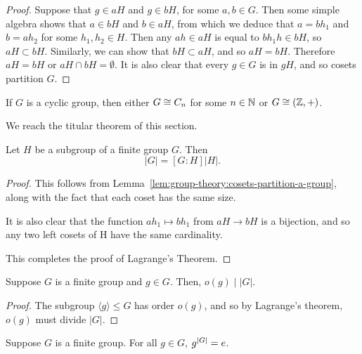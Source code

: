 \begin{proof}
  Suppose that \(g \in aH\) and \(g \in bH\), for some \(a, b \in G\).
  Then some simple algebra shows that \(a \in bH\) and \(b \in aH\), from which we deduce that \(a = b h_{1}\) and \(b = a h_{2}\) for some \(h_{1}, h_{2} \in H\).
  Then any \(ah \in aH\) is equal to \(bh_{1}h \in bH\), so \(aH \subset bH\).
  Similarly, we can show that \(bH \subset aH\), and so \(aH = bH\).
  Therefore \(aH = bH\) or \(aH \cap bH = \emptyset\).
  It is also clear that every \(g \in G\) is in \(gH\), and so cosets partition \(G\).
\end{proof}

\begin{lemma}
  If \(G\) is a cyclic group, then either \(G \cong C_{n}\) for some \(n \in \mathbb{N}\) or \(G \cong (\mathbb{Z}, +)\).
\end{lemma}

We reach the titular theorem of this section.

\begin{theorem}\label{thm:group-theory:Lagranges-theorem}
  Let \(H\) be a subgroup of a finite group \(G\). Then
  \[|G| = [G : H]|H|.\]
\end{theorem}

\begin{proof}
  This follows from Lemma~\ref{lem:group-theory:cosets-partition-a-group}, along with the fact that each coset has the same size.

  It is also clear that the function \(ah_{1} \mapsto bh_{1}\)  from \(aH \to bH\) is a bijection, and so any two left cosets of H have the same cardinality.

  This completes the proof of Lagrange's Theorem.
\end{proof}



\begin{corollary}
\label{cor:group-theory:order-divides-group}
  Suppose \(G\) is a finite group and \(g \in G\).
  Then, \(o(g) \mid \left|G\right|\).
\end{corollary}

\begin{proof}
  The subgroup \(\langle g \rangle \leq G\) has order \(o(g)\), and so by Lagrange's theorem, \(o(g)\) must divide \(|G|\).
\end{proof}

\begin{corollary}
\label{cor:group-theory:g-to-power-of-group-order-is-e}
  Suppose \(G\) is a finite group.
  For all \(g \in G\), \(g^{\abs{G}} = e\).
\end{corollary}

